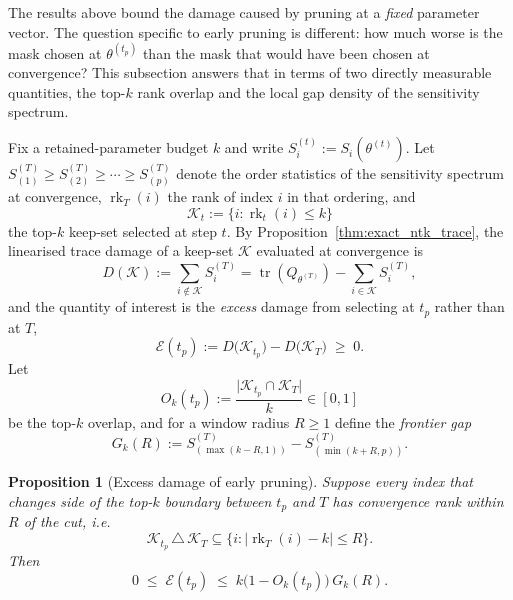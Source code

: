 \documentclass{article}
\newtheorem{proposition}[theorem]{Proposition}
\theoremstyle{definition}
\theoremstyle{remark}
\begin{document}
The results above bound the damage caused by pruning at a \emph{fixed} parameter
vector. The question specific to early pruning is different: how much worse is
the mask chosen at $\theta^{(t_p)}$ than the mask that would have been chosen at
convergence? This subsection answers that in terms of two directly measurable
quantities, the top-$k$ rank overlap and the local gap density of the
sensitivity spectrum.

Fix a retained-parameter budget $k$ and write $S^{(t)}_i:=S_i(\theta^{(t)})$.
Let $S^{(T)}_{(1)}\ge S^{(T)}_{(2)}\ge\cdots\ge S^{(T)}_{(p)}$ denote the order
statistics of the sensitivity spectrum at convergence, $\operatorname{rk}_T(i)$
the rank of index $i$ in that ordering, and
\[
\mathcal K_t
:=
\bigl\{
i : \operatorname{rk}_t(i)\le k
\bigr\}
\]
the top-$k$ keep-set selected at step $t$. By
Proposition~\ref{thm:exact_ntk_trace}, the linearised trace damage of a
keep-set $\mathcal K$ evaluated at convergence is
\[
D(\mathcal K)
:=
\sum_{i\notin\mathcal K} S^{(T)}_i
=
\operatorname{tr}(Q_{\theta^{(T)}})
-
\sum_{i\in\mathcal K} S^{(T)}_i,
\]
and the quantity of interest is the \emph{excess} damage from selecting at
$t_p$ rather than at $T$,
\begin{equation}
    \mathcal E(t_p)
    :=
    D\bigl(\mathcal K_{t_p}\bigr)
    -
    D\bigl(\mathcal K_{T}\bigr)
    \;\ge\;0 .
    \label{eq:excess-damage}
\end{equation}
Let
\[
O_k(t_p)
:=
\frac{
\bigl|\mathcal K_{t_p}\cap\mathcal K_T\bigr|
}{k}
\in[0,1]
\]
be the top-$k$ overlap, and for a window radius $R\ge1$ define the
\emph{frontier gap}
\begin{equation}
    G_k(R)
    :=
    S^{(T)}_{(\max(k-R,1))}
    -
    S^{(T)}_{(\min(k+R,p))}.
    \label{eq:frontier-gap}
\end{equation}

\begin{proposition}[Excess damage of early pruning]
\label{prop:early-prune}
Suppose every index that changes side of the top-$k$ boundary between $t_p$ and
$T$ has convergence rank within $R$ of the cut, i.e.
\begin{equation}
    \mathcal K_{t_p}\,\triangle\,\mathcal K_T
    \subseteq
    \bigl\{
    i:\bigl|\operatorname{rk}_T(i)-k\bigr|\le R
    \bigr\}.
    \label{eq:local-churn}
\end{equation}
Then
\[
0
\;\le\;
\mathcal E(t_p)
\;\le\;
k\bigl(1-O_k(t_p)\bigr)\,G_k(R).
\]
\end{proposition}
\end{document}
